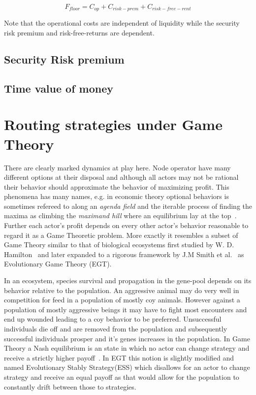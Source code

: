 \[ F_{floor} = C_{op} + C_{risk-prem} + C_{risk-free-rent} \]

Note that the operational costs are independent of liquidity while the security risk premium and risk-free-returns are dependent.

\subsection{Security Risk premium}

\subsection{Time value of money}

\section{Routing strategies under Game Theory}

There are clearly marked dynamics at play here. Node operator have many different options at their disposal and although all actors may not be rational their behavior should approximate the behavior of maximizing profit. This phenomena has many names, e.g. in economic theory optional behaviors is sometimes refereed to along an \textit{agenda field} and the iterable process of finding the maxima as climbing the \textit{maximand hill} where an equilibrium lay at the top~\cite{boulding:evolutionary:economy}. Further each actor's profit depends on every other actor's behavior reasonable to regard it as a Game Theoretic problem. More exactly it resembles a subset of Game Theory similar to that of biological ecosystems first studied by W. D. Hamilton~\cite{hamilton:behavior} and later expanded to a rigorous framework by J.M Smith et al.~\cite{smith:price:logic:animal, smith:evolution:games} as Evolutionary Game Theory (EGT).

In an ecosystem, species survival and propagation in the gene-pool depends on its behavior relative to the population. An aggressive animal may do very well in competition for feed in a population of mostly coy animals. However against a population of mostly aggressive beings it may have to fight most encounters and end up wounded leading to a coy behavior to be preferred. Unsuccessful individuals die off and are removed from the population and subsequently successful individuals prosper and it's genes increases in the population. In Game Theory a Nash equilibrium is an state in which no actor can change strategy and receive a strictly higher payoff~\cite{nash:equilibrium}. In EGT this notion is slightly modified and named Evolutionary Stably Strategy(ESS) which disallows for an actor to change strategy and receive an equal payoff as that would allow for the population to constantly drift between those to strategies. 

